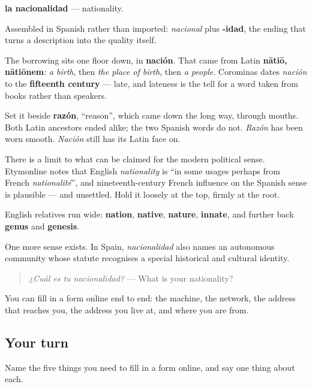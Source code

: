 \begin{cousinweb}
\textbf{la nacionalidad} — nationality.

Assembled in Spanish rather than imported: \emph{nacional} plus \textbf{-idad}, the ending that turns a description into the quality itself.

The borrowing sits one floor down, in \textbf{nación}. That came from Latin \textbf{nātiō, nātiōnem}: \emph{a birth}, then \emph{the place of birth}, then \emph{a people}. Corominas dates \emph{nación} to the \textbf{fifteenth century} — late, and lateness is the tell for a word taken from books rather than speakers.

Set it beside \textbf{razón}, \textquotedblleft{}reason\textquotedblright{}, which came down the long way, through mouths. Both Latin ancestors ended alike; the two Spanish words do not. \emph{Razón} has been worn smooth. \emph{Nación} still has its Latin face on.

There is a limit to what can be claimed for the modern political sense. Etymonline notes that English \emph{nationality} is \textquotedblleft{}in some usages perhaps from French \emph{nationalité}\textquotedblright{}, and nineteenth-century French influence on the Spanish sense is plausible — and unsettled. Hold it loosely at the top, firmly at the root.

English relatives run wide: \textbf{nation}, \textbf{native}, \textbf{nature}, \textbf{innate}, and further back \textbf{genus} and \textbf{genesis}.

One more sense exists. In Spain, \emph{nacionalidad} also names an autonomous community whose statute recognises a special historical and cultural identity.

\begin{quote}
\emph{¿Cuál es tu nacionalidad?} — What is your nationality?
\end{quote}
\end{cousinweb}

\begin{grammarlens}[title={What you've built}]
You can fill in a form online end to end: the machine, the network, the address that reaches you, the address you live at, and where you are from.
\end{grammarlens}

\subsection*{Your turn}
Name the five things you need to fill in a form online, and say one thing about each.


